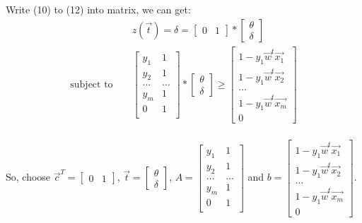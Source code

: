\begin{enumerate}
\begin{enumerate}
\begin{enumerate}
Write (10) to (12) into matrix, we can get:\\
\begin{eqnarray}
    & & z(\vec{t}) = \delta = \begin{bmatrix}
     0 & 1 
     \end{bmatrix} * \begin{bmatrix}
    \theta \\ \delta 
    \end{bmatrix}\\    
    \textrm{subject to } & & \begin{bmatrix}
    y_1 & 1 \\
    y_2 & 1 \\
    \ldots & \ldots \\
    y_m & 1 \\
    0 & 1 \\
    \end{bmatrix} * \begin{bmatrix}
    \theta \\ \delta
    \end{bmatrix} \geq \begin{bmatrix}
    1 - y_1 \vec{w}^t \vec{x_1} \\ 1 - y_1 \vec{w}^t \vec{x_2} \\ \ldots \\ 1 - y_1 \vec{w}^t \vec{x_m} \\ 0
    \end{bmatrix}
\end{eqnarray}\\

So, choose $\vec{c}^T = \begin{bmatrix} 0 & 1 \end{bmatrix}$, $\vec{t} = \begin{bmatrix} \theta \\ \delta \end{bmatrix}$, $A = \begin{bmatrix}
    y_1 & 1 \\
    y_2 & 1 \\
    \ldots & \ldots \\
    y_m & 1 \\  
    0 & 1 \\
    \end{bmatrix}$
    and $b = \begin{bmatrix}
    1 - y_1 \vec{w}^t \vec{x_1} \\ 1 - y_1 \vec{w}^t \vec{x_2} \\ \ldots \\ 1 - y_1 \vec{w}^t \vec{x_m} \\ 0
    \end{bmatrix}$.\\ 
    

\end{enumerate}
\end{enumerate}
\end{enumerate}
